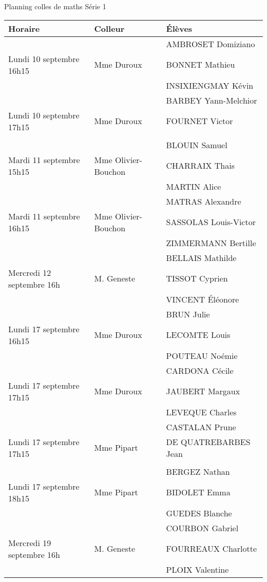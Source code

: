 \documentclass[11pt]{book}%
\begin{document}
\centering

{\huge Planning colles de maths Série 1}

\vspace{1cm}

\begin{tabular}{|l|l||l|}
 \hline
 Horaire & Colleur & Élèves \\
 \hline
 \hline
 & & AMBROSET Domiziano \\
 \cline{3-3}
 Lundi 10 septembre 16h15 & Mme Duroux & BONNET Mathieu \\
 \cline{3-3}
 & & INSIXIENGMAY Kévin \\
 \hline
 \hline
 & & BARBEY Yann-Melchior \\
 \cline{3-3}
 Lundi 10 septembre 17h15 & Mme Duroux & FOURNET Victor \\
 \cline{3-3}
 & & \\
 \hline
 \hline
 & & BLOUIN Samuel \\
 \cline{3-3}
 Mardi 11 septembre 15h15 & Mme Olivier-Bouchon & CHARRAIX Thais \\
 \cline{3-3}
 & & MARTIN Alice \\
 \hline
 \hline
 & & MATRAS Alexandre \\
 \cline{3-3}
 Mardi 11 septembre 16h15 & Mme Olivier-Bouchon & SASSOLAS Louis-Victor 
 \\
 \cline{3-3}
 & & ZIMMERMANN Bertille \\
 \hline
 \hline
 & & BELLAIS Mathilde \\
 \cline{3-3}
 Mercredi 12 septembre 16h & M. Geneste & TISSOT Cyprien \\
 \cline{3-3}
 & & VINCENT Éléonore \\
 \hline
 \hline
 & & BRUN Julie \\
 \cline{3-3}
 Lundi 17 septembre 16h15 & Mme Duroux & LECOMTE Louis \\
 \cline{3-3}
 & & POUTEAU Noémie \\
 \hline
 \hline
 & & CARDONA Cécile \\
 \cline{3-3}
 Lundi 17 septembre 17h15 & Mme Duroux & JAUBERT Margaux \\
 \cline{3-3}
 & & LEVEQUE Charles \\
 \hline
 \hline
 & & CASTALAN Prune \\
 \cline{3-3}
 Lundi 17 septembre 17h15 & Mme Pipart & DE QUATREBARBES Jean \\
 \cline{3-3}
 & & \\
 \hline
 \hline
 & & BERGEZ Nathan \\
 \cline{3-3}
 Lundi 17 septembre 18h15 & Mme Pipart & BIDOLET Emma \\
 \cline{3-3}
 & & GUEDES Blanche \\
 \hline
 \hline
 & & COURBON Gabriel \\
 \cline{3-3}
 Mercredi 19 septembre 16h & M. Geneste & FOURREAUX Charlotte \\
 \cline{3-3}
 & & PLOIX Valentine \\
 \hline
\end{tabular}
\end{document}
